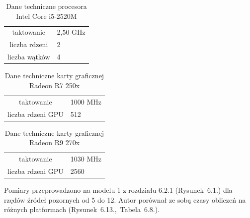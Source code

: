\begin{table}[H]
        \centering
        \begin{threeparttable}
                \caption{Dane techniczne procesora Intel Core i5-2520M}\label{tab:table_example}
                \begin{tabularx}{0.6\textwidth}{| c | X |}
                       \midrule
		taktowanie & 2,50 GHz \\
                     liczba rdzeni & 2 \\
                    liczba wątków & 4 \\
                        \bottomrule
                \end{tabularx}
        \end{threeparttable}
\end{table}

\begin{table}[H]
        \centering
        \begin{threeparttable}
                \caption{Dane techniczne karty graficznej Radeon R7 250x}\label{tab:table_example}
                \begin{tabularx}{0.6\textwidth}{| c | X |}
                       \midrule
		taktowanie & 1000 MHz \\
                     liczba rdzeni GPU & 512 \\
                        \bottomrule
                \end{tabularx}
        \end{threeparttable}
\end{table}

\begin{table}[H]
        \centering
        \begin{threeparttable}
                \caption{Dane techniczne karty graficznej Radeon R9 270x}\label{tab:table_example}
                \begin{tabularx}{0.6\textwidth}{| c | X |}
                       \midrule
		taktowanie & 1030 MHz \\
                     liczba rdzeni GPU & 2560 \\
                        \bottomrule
                \end{tabularx}
        \end{threeparttable}
\end{table}

Pomiary przeprowadzono na modelu 1 z rozdziału 6.2.1 (Rysunek~6.1.) dla rzędów źródeł pozornych od 5 do 12. Autor porównał ze sobą czasy obliczeń na różnych platformach (Rysunek~6.13.,~Tabela~6.8.).

